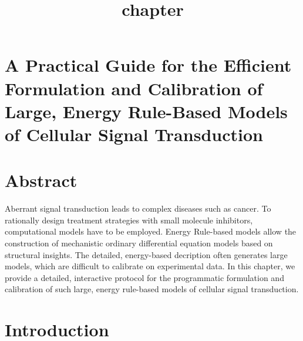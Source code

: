 \documentclass[11pt]{article}
\title{chapter}
\begin{document}
    
    \maketitle
    
    

    
    \hypertarget{a-practical-guide-for-the-efficient-formulation-and-calibration-of-large-energy-rule-based-models-of-cellular-signal-transduction}{%
\section{A Practical Guide for the Efficient Formulation and Calibration
of Large, Energy Rule-Based Models of Cellular Signal
Transduction}\label{a-practical-guide-for-the-efficient-formulation-and-calibration-of-large-energy-rule-based-models-of-cellular-signal-transduction}}

    \hypertarget{abstract}{%
\section{Abstract}\label{abstract}}

    Aberrant signal transduction leads to complex diseases such as cancer.
To rationally design treatment strategies with small molecule
inhibitors, computational models have to be employed. Energy Rule-based
models allow the construction of mechanistic ordinary differential
equation models based on structural insights. The detailed, energy-based
decription often generates large models, which are difficult to
calibrate on experimental data. In this chapter, we provide a detailed,
interactive protocol for the programmatic formulation and calibration of
such large, energy rule-based models of cellular signal transduction.

    \hypertarget{introduction}{%
\section{Introduction}\label{introduction}}
\end{document}
